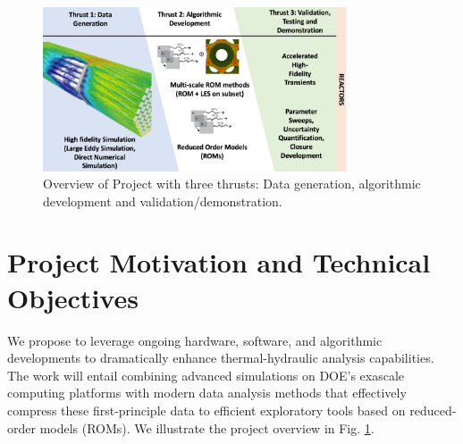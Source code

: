 \begin{figure}[t!] \centering
    \includegraphics[width = 0.80\textwidth]{figs/overview.png}
    \caption{Overview of Project with three thrusts: Data generation,
             algorithmic development and validation/demonstration.  \label{fig:sum}}
\end{figure}


\section{Project Motivation and Technical Objectives}

We propose to leverage ongoing hardware, software, and algorithmic developments
to dramatically enhance thermal-hydraulic analysis capabilities.  The work will
entail combining advanced simulations on DOE's exascale computing platforms
with modern data analysis methods that effectively compress these
first-principle data to efficient exploratory tools based on reduced-order
models (ROMs).
We illustrate the project overview in Fig. \ref{fig:sum}.

